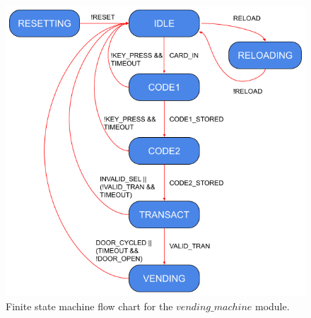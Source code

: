\documentclass{article}
\begin{document}
\begin{figure}[H]
    \centering
    \includegraphics[scale=0.44]{../figs/FSM.png}
    \caption{Finite state machine flow chart for the $vending\_machine$ module.}
    \label{fig:fsm}
\end{figure}

\pagebreak
\end{document}

